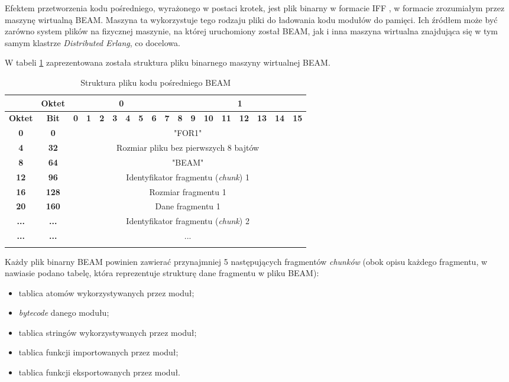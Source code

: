 Efektem przetworzenia kodu pośredniego, wyrażonego w postaci krotek, jest plik binarny w formacie IFF \cite{morrison1985ea}, w formacie zrozumiałym przez maszynę wirtualną BEAM. Maszyna ta wykorzystuje tego rodzaju pliki do ładowania kodu modułów do pamięci. Ich źródłem może być zarówno system plików na fizycznej maszynie, na której uruchomiony został BEAM, jak i inna maszyna wirtualna znajdująca się w tym samym klastrze \emph{Distributed Erlang}, co docelowa.

W tabeli \ref{table:beamFile} zaprezentowana została struktura pliku binarnego maszyny wirtualnej BEAM.

\begin{longtable}{|c|c|c|c|c|c|c|c|c|c|c|c|c|c|c|c|c|c|}
\hline
         & \textbf{Oktet} & \multicolumn{8}{|c|}{\textbf{0}} & \multicolumn{8}{|c|}{\textbf{1}} \\
\hline
\textbf{Oktet} & \textbf{Bit} & \textbf{0} & \textbf{1} & \textbf{2} & \textbf{3} & \textbf{4} & \textbf{5} & \textbf{6} & \textbf{7} & \textbf{8} & \textbf{9} & \textbf{10} & \textbf{11} & \textbf{12} & \textbf{13} & \textbf{14} & \textbf{15}\\
\hline
\textbf{0} & \textbf{0} & \multicolumn{16}{|c|}{"FOR1"} \\[2ex]
\hline
\textbf{4} & \textbf{32} & \multicolumn{16}{|c|}{Rozmiar pliku bez pierwszych 8 bajtów}\\[2ex]
\hline
\textbf{8} & \textbf{64} & \multicolumn{16}{|c|}{"BEAM"} \\[2ex]
\hline
\textbf{12} & \textbf{96} & \multicolumn{16}{|c|}{Identyfikator fragmentu (\emph{chunk}) 1}\\[2ex]
\hline
\textbf{16} & \textbf{128} & \multicolumn{16}{|c|}{Rozmiar fragmentu 1} \\[2ex]
\hline
\textbf{20} & \textbf{160} & \multicolumn{16}{|c|}{Dane fragmentu 1} \\[10ex]
\hline
\textbf{...} & \textbf{...} & \multicolumn{16}{|c|}{Identyfikator fragmentu (\emph{chunk}) 2}\\[2ex]
\hline
\textbf{...} & \textbf{...} & \multicolumn{16}{|c|}{...} \\
\hline
\caption{Struktura pliku kodu pośredniego BEAM}
\label{table:beamFile} \\
\end{longtable}

Każdy plik binarny BEAM powinien zawierać przynajmniej 5 następujących fragmentów \emph{chunków} (obok opisu każdego fragmentu, w nawiasie podano tabelę, która reprezentuje strukturę dane fragmentu w pliku BEAM):
\begin{itemize}
\item tablica atomów wykorzystywanych przez moduł;
\item \emph{bytecode} danego modułu;
\item tablica stringów wykorzystywanych przez moduł;
\item tablica funkcji importowanych przez moduł;
\item tablica funkcji eksportowanych przez moduł.
\end{itemize}

